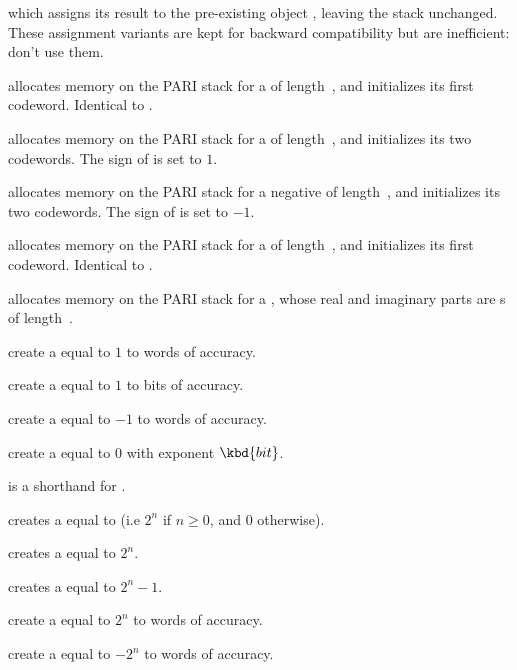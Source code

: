\noindent which assigns its result to the pre-existing object
, leaving the stack unchanged. These assignment variants are kept for
backward compatibility but are inefficient: don't use them.


 allocates memory on the PARI stack for a 
of length~, and initializes its first codeword. Identical to
.

 allocates memory on the PARI stack for a
 of length~, and initializes its two codewords. The sign
of  is set to $1$.

 allocates memory on the PARI stack for a negative
 of length~, and initializes its two codewords. The sign
of  is set to $-1$.

 allocates memory on the PARI stack for a 
of length~, and initializes its first codeword. Identical to
.

 allocates memory on the PARI stack for a
, whose real and imaginary parts are s
of length~.

 create a  equal to $1$ to 
words of accuracy.

 create a  equal to $1$ to
 bits of accuracy.

 create a  equal to $-1$ to 
words of accuracy.

 create a  equal to $0$ with
exponent $\kbd{bit}$.

 is a shorthand for .

 creates a  equal to  (i.e
$2^n$ if $n \geq 0$, and $0$ otherwise).

 creates a  equal to $2^n$.

 creates a  equal to $2^n - 1$.

 create a  equal to $2^n$
to  words of accuracy.

 create a  equal to $-2^n$
to  words of accuracy.

